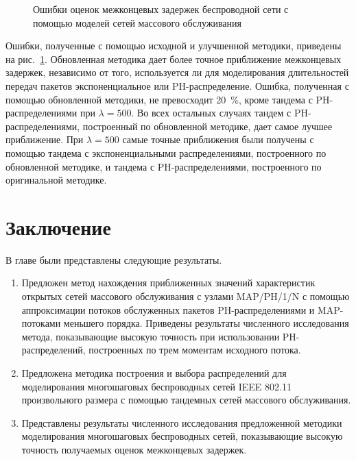 \begin{figure}[h]
  \caption{Ошибки оценок межконцевых задержек беспроводной сети с помощью моделей сетей массового обслуживания}
  \label{fig:ch4_ns3_tandem_errors}
\end{figure}

Ошибки, полученные с помощью исходной и улучшенной методики, приведены на рис.~\ref{fig:ch4_ns3_tandem_errors}. Обновленная методика дает более точное приближение межконцевых задержек, независимо от того, используется ли для моделирования длительностей передач пакетов экспоненциальное или PH-распределение. Ошибка, полученная с помощью обновленной методики, не превосходит 20~\%, кроме тандема с PH-распределениями при $\lambda = 500$. Во всех остальных случаях тандем с PH-распределениями, построенный по обновленной методике, дает самое лучшее приближение. При $\lambda = 500$ самые точные приближения были получены с помощью тандема с экспоненциальными распределениями, построенного по обновленной методике, и тандема с PH-распределениями, построенного по оригинальной методике.



\section{Заключение}\label{sec:ch4_conclusion}
В главе были представлены следующие результаты.

\begin{enumerate}
  \item Предложен метод нахождения приближенных значений характеристик открытых сетей массового обслуживания с узлами MAP/PH/1/N с помощью аппроксимации потоков обслуженных пакетов PH-распределениями и MAP-потоками меньшего порядка. Приведены результаты численного исследования метода, показывающие высокую точность при использовании PH-распределений, построенных по трем моментам исходного потока.
  \item Предложена методика построения и выбора распределений для моделирования многошаговых беспроводных сетей IEEE 802.11 произвольного размера с помощью тандемных сетей массового обслуживания.
  \item Представлены результаты численного исследования предложенной методики моделирования многошаговых беспроводных сетей, показывающие высокую точность получаемых оценок межконцевых задержек.
\end{enumerate}


\clearpage

